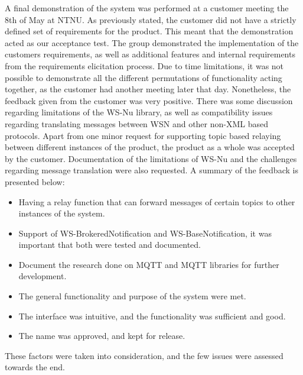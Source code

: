 A final demonstration of the system was performed at a customer meeting the 8th of May at NTNU. As previously stated, the customer did not have a strictly defined set of requirements for the product. This meant that the demonstration acted as our acceptance test. The group demonstrated the implementation of the customers requirements, as well as additional features and internal requirements from the requirements elicitation process. Due to time limitations, it was not possible to demonstrate all the different permutations of functionality acting together, as the customer had another meeting later that day. Nonetheless, the feedback given from the customer was very positive. There was some discussion regarding limitations of the WS-Nu library, as well as compatibility issues regarding translating messages between WSN and other non-XML based protocols. Apart from one minor request for supporting topic based relaying between different instances of the product, the product as a whole was accepted by the customer. Documentation of the limitations of WS-Nu and the challenges regarding message translation were also requested. A summary of the feedback is presented below:

\begin{itemize}
\item Having a relay function that can forward messages of certain topics to other instances of the system.
\item Support of WS-BrokeredNotification \cite{wsn-brokerednotification} and WS-BaseNotification, it was important that both were tested and documented.
\item Document the research done on MQTT and MQTT libraries for further development.
\item The general functionality and purpose of the system were met.
\item The interface was intuitive, and the functionality was sufficient and good.
\item The name was approved, and kept for release.
\end{itemize}

These factors were taken into consideration, and the few issues were assessed towards the end.

\clearpage